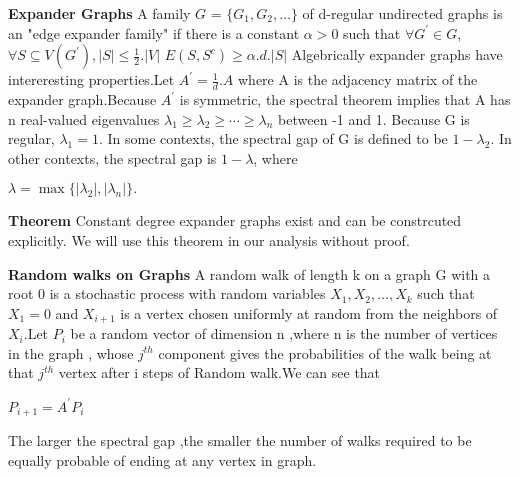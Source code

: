 \documentclass[11pt]{article}
\begin{document}
\newline \textbf {Expander Graphs}
A family $G$ = $\{G_{1}, G_{2}, \ldots \}$ of d-regular undirected graphs is an "edge expander family" if there is a constant $\alpha > 0$ such that $\forall G^{'} \in G $, $\forall S\subseteq V(G^{'}) ,|S| \leqslant \frac{1}{2}.|V| $
\newline $E(S,S^c)\geqslant \alpha .d.|S|$
\newline Algebrically expander graphs have intereresting properties.Let $A^{'} = \frac{1}{d}.A$ where A is the adjacency matrix of the expander graph.Because $A^{'}$ is symmetric, the spectral theorem implies that A has n real-valued eigenvalues $\lambda_1 \ge \lambda_2 \ge \cdots \ge \lambda_{n} $ between -1 and 1. Because G is regular, $\lambda_1=1$. In some contexts, the spectral gap of G is defined to be $1-\lambda_2$. In other contexts, the spectral gap is $1-\lambda$, where

    $\lambda=\max\{|\lambda_2|, |\lambda_{n}|\}.$

\textbf {Theorem}
Constant degree expander graphs exist and can be constrcuted explicitly.
\newline We will use this theorem in our analysis without proof.

\textbf{Random walks on Graphs}
A random walk of length k on a  graph G with a root 0 is a stochastic process with random variables $X_1,X_2,\dots,X_k $ such that $X_1=0$ and ${X_{i+1}}$  is a vertex chosen uniformly at random from the neighbors of $X_i$.Let $P_{i}$ be a random vector of dimension n ,where n is the number of vertices in the graph , whose $j^{th}$ component  gives the probabilities of the walk being at that $j^{th}$ vertex after i steps of Random walk.We can see that 

$P_{i+1}=A^{'}P_{i}$

 
The larger the spectral gap ,the smaller the number of walks required to be equally probable of ending at any vertex in graph.
\end{document}
